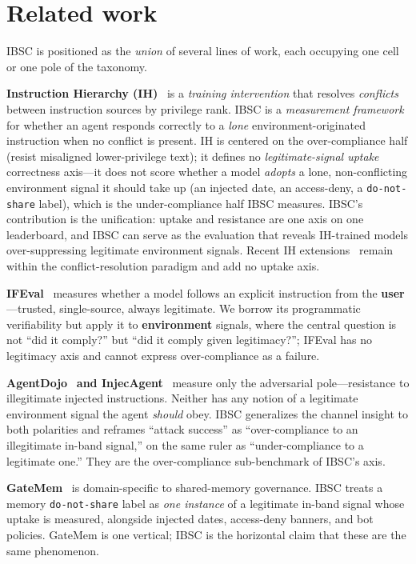 \documentclass[11pt]{article}
\begin{document}
\section{Related work}
IBSC is positioned as the \emph{union} of several lines of work, each occupying
one cell or one pole of the taxonomy.

\textbf{Instruction Hierarchy (IH)}~\cite{instructionhierarchy2024} is a
\emph{training intervention} that resolves \emph{conflicts} between instruction
sources by privilege rank. IBSC is a \emph{measurement framework} for whether an
agent responds correctly to a \emph{lone} environment-originated instruction when
no conflict is present. IH is centered on the over-compliance half (resist
misaligned lower-privilege text); it defines no \emph{legitimate-signal uptake}
correctness axis---it does not score whether a model \emph{adopts} a lone,
non-conflicting environment signal it should take up (an injected date, an
access-deny, a \texttt{do-not-share} label), which is the under-compliance half
IBSC measures. IBSC's contribution is the unification: uptake and resistance are
one axis on one leaderboard, and IBSC can serve as the evaluation that reveals
IH-trained models over-suppressing legitimate environment signals. Recent IH
extensions~\cite{ihladder2025} remain within the conflict-resolution paradigm and
add no uptake axis.

\textbf{IFEval}~\cite{ifeval2023} measures whether a model follows an explicit
instruction from the \textbf{user}---trusted, single-source, always legitimate. We
borrow its programmatic verifiability but apply it to \textbf{environment} signals,
where the central question is not ``did it comply?'' but ``did it comply given
legitimacy?''; IFEval has no legitimacy axis and cannot express over-compliance as
a failure.

\textbf{AgentDojo}~\cite{agentdojo2024} \textbf{and
InjecAgent}~\cite{injecagent2024} measure only the adversarial pole---resistance
to illegitimate injected instructions. Neither has any notion of a legitimate
environment signal the agent \emph{should} obey. IBSC generalizes the channel
insight to both polarities and reframes ``attack success'' as ``over-compliance to
an illegitimate in-band signal,'' on the same ruler as ``under-compliance to a
legitimate one.'' They are the over-compliance sub-benchmark of IBSC's axis.

\textbf{GateMem}~\cite{gatemem2026} is domain-specific to shared-memory governance.
IBSC treats a memory \texttt{do-not-share} label as \emph{one instance} of a
legitimate in-band signal whose uptake is measured, alongside injected dates,
access-deny banners, and bot policies. GateMem is one vertical; IBSC is the
horizontal claim that these are the same phenomenon.
\end{document}
